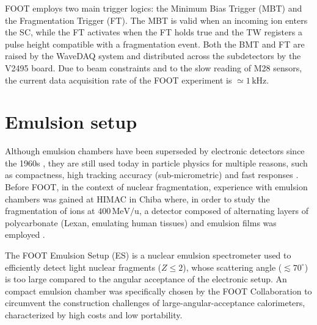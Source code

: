 FOOT employs two main trigger logics: the Minimum Bias Trigger (MBT) and the Fragmentation Trigger (FT). The MBT is valid when an incoming ion enters the SC, while the FT activates when the FT holds true and the TW registers a pulse height compatible with a fragmentation event. Both the BMT and FT are raised by the WaveDAQ system and distributed across the subdetectors by the V2495 board. Due to beam constraints and to the slow reading of M28 sensors, the current data acquisition rate of the FOOT experiment is $\simeq1\,\mathrm{kHz}$.
\section{Emulsion setup}\label{sec:emulsion_setup}
Although emulsion chambers have been superseded by electronic detectors since the 1960s \cite{Ariga2020}, they are still used today in particle physics for multiple reasons, such as compactness, high tracking accuracy (sub-micrometric) and fast responses \cite{measurement_impact_foot}. Before FOOT, in the context of nuclear fragmentation, experience with emulsion chambers was gained at HIMAC in Chiba where, in order to study the fragmentation of  ions at $400\,\mathrm{MeV/u}$, a detector composed of alternating layers of polycarbonate (Lexan, emulating human tissues) and emulsion films was employed \cite{articleNakamura,articleLellis1,articleLellis2}.

The FOOT Emulsion Setup (ES) is a nuclear emulsion spectrometer used to efficiently detect light nuclear fragments ($Z\leq2$), whose scattering angle ($\lesssim70^\circ$) is too large compared to the angular acceptance of the electronic setup. An compact emulsion chamber was specifically chosen by the FOOT Collaboration to circumvent the construction challenges of large-angular-acceptance calorimeters, characterized by high costs and low portability.

